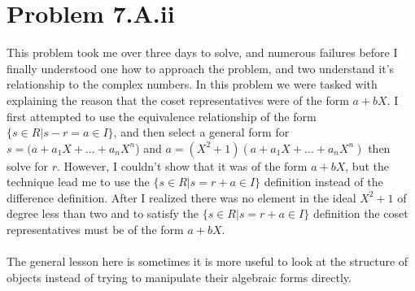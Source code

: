 \documentclass{article}
\begin{document}
  \section*{Problem 7.A.ii}
    This problem took me over three days to solve, and numerous failures before I finally understood one how to approach the problem, and two understand it's relationship to the complex numbers. In this problem we were tasked with explaining the reason that the coset representatives were of the form $a + bX$. I first attempted to use the equivalence relationship of the form $\{s\in R | s-r = a\in I\}$, and then select a general form for $s = (a + a_1X + \dots + a_nX^n$) and $a= (X^2 + 1)(a + a_1X + \dots + a_nX^n)$ then solve for $r$. However, I couldn't show that it was of the form $a + bX$, but the technique lead me to use the $\{s\in R | s = r + a\in I\}$ definition instead of the difference definition. After I realized there was no element in the ideal $X^2 + 1$ of degree less than two and to satisfy the $\{s\in R | s = r + a\in I\}$ definition the coset representatives must be of the form $a + bX$.

    \paragraph{} The general lesson  here is sometimes it is more useful to look at the structure of objects instead of trying to manipulate their algebraic forms directly. 

    
  
\end{document}
